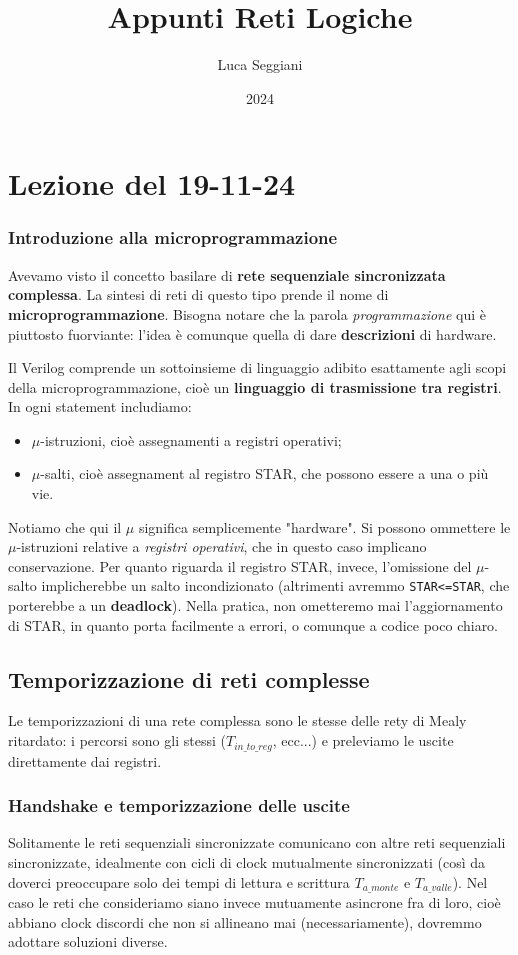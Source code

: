\documentclass[a4paper,11pt]{article}
\title{Appunti Reti Logiche}
\author{Luca Seggiani}
\date{2024}
\begin{document}
\section{Lezione del 19-11-24}

\thispagestyle{empty}
\pagestyle{fancy}

\subsubsection{Introduzione alla microprogrammazione}
Avevamo visto il concetto basilare di \textbf{rete sequenziale sincronizzata complessa}.
La sintesi di reti di questo tipo prende il nome di \textbf{microprogrammazione}. 
Bisogna notare che la parola \textit{programmazione} qui è piuttosto fuorviante: l'idea è comunque quella di dare \textbf{descrizioni} di hardware.

Il Verilog comprende un sottoinsieme di linguaggio adibito esattamente agli scopi della microprogrammazione, cioè un \textbf{linguaggio di trasmissione tra registri}.
In ogni statement includiamo:
\begin{itemize}
	\item $\mu$-istruzioni, cioè assegnamenti a registri operativi;
	\item $\mu$-salti, cioè assegnament al registro STAR, che possono essere a una o più vie.
\end{itemize}
Notiamo che qui il $\mu$ significa semplicemente "hardware".
Si possono ommettere le $\mu$-istruzioni relative a \textit{registri operativi}, che in questo caso implicano conservazione.
Per quanto riguarda il registro STAR, invece, l'omissione del $\mu$-salto implicherebbe un salto incondizionato (altrimenti avremmo \lstinline|STAR<=STAR|, che porterebbe a un \textbf{deadlock}).
Nella pratica, non ometteremo mai l'aggiornamento di STAR, in quanto porta facilmente a errori, o comunque a codice poco chiaro.

\subsection{Temporizzazione di reti complesse}
Le temporizzazioni di una rete complessa sono le stesse delle rety di Mealy ritardato: i percorsi sono gli stessi ($T_{in\_to\_reg}$, ecc...) e preleviamo le uscite direttamente dai registri.

\subsubsection{Handshake e temporizzazione delle uscite}
Solitamente le reti sequenziali sincronizzate comunicano con altre reti sequenziali sincronizzate, idealmente con cicli di clock mutualmente sincronizzati (così da doverci preoccupare solo dei tempi di lettura e scrittura $T_{a\_monte}$ e $T_{a\_valle}$).
Nel caso le reti che consideriamo siano invece mutuamente asincrone fra di loro, cioè abbiano clock discordi che non si allineano mai (necessariamente), dovremmo adottare soluzioni diverse. 
\end{document}
